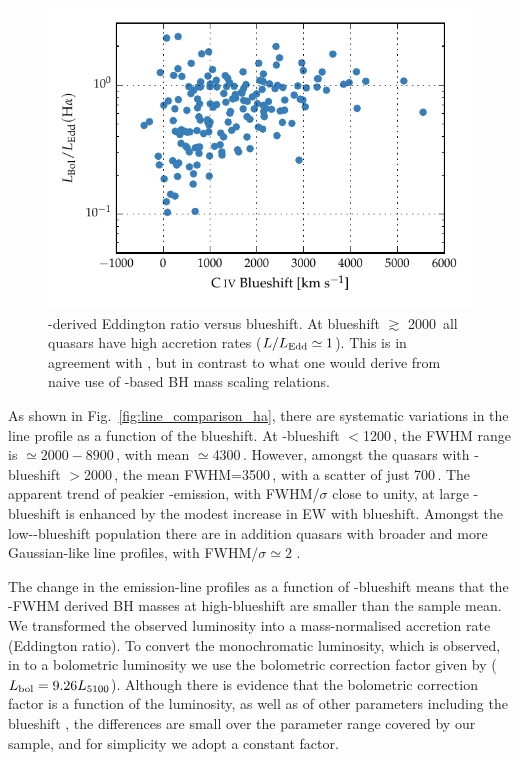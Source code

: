 \begin{figure}
    \centering
    \includegraphics[width=0.8\linewidth]{figures/chapter03/ha_edd_civ_bs.pdf}
    \caption{\hans-derived Eddington ratio versus  blueshift. At blueshift $\gtrsim$ 2000\kms\, all quasars have high accretion rates ($L/L_{\rm Edd} \simeq 1$). This is in agreement with \citet{kratzer15}, but in contrast to what one would derive from naive use of -based BH mass scaling relations.}
    \label{fig:ha_edd_civ_bs}
\end{figure}


As shown in Fig.~\ref{fig:line_comparison_ha}, there are systematic variations in the \ha line profile as a function of the  blueshift. 
At -blueshift $<$1200\,\kms, the \ha FWHM range is $\simeq2000 - 8900$\,\kms, with mean $\simeq$4300\,\kms.
However, amongst the quasars with -blueshift $>$2000\,\kms, the mean \ha FWHM=3500\,\kms, with a scatter of just 700\,\kms. 
The apparent trend of peakier \hans-emission, with FWHM/$\sigma$ close to unity, at large -blueshift is enhanced by the modest increase in \ha EW with blueshift. 
Amongst the low--blueshift population there are in addition quasars with broader and more Gaussian-like \ha line profiles, with FWHM/$\sigma \simeq 2$ . 

The change in the \ha emission-line profiles as a function of -blueshift means that the \hans-FWHM derived BH masses at high-blueshift are smaller than the sample mean. 
We transformed the observed luminosity into a mass-normalised accretion rate (Eddington ratio).
To convert the monochromatic luminosity, which is observed, in to a bolometric luminosity we use the bolometric correction factor given by \citet{richards06} ($L_{\rm bol} = 9.26L_{5100}$).
Although there is evidence that the bolometric correction factor is a function of the luminosity, as well as of other parameters including the  blueshift \citep{krawczyk13}, the differences are small over the parameter range covered by our sample, and for simplicity we adopt a constant factor. 

